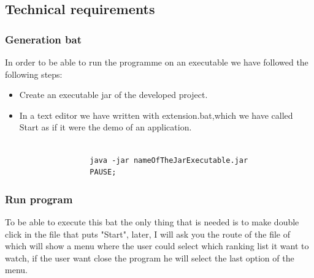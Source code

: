 \documentclass[a4paper]{article}
\theoremstyle{plain}
\theoremstyle{definition}
\begin{document}
    \subsection{Technical requirements}
        \subsubsection{Generation bat}
            In order to be able to run the programme on an executable we have followed the following steps:
        \begin{itemize}
            \item Create an executable jar of the developed project. 
            \item In a text editor we have written with extension.bat,which we have called Start as if it were the demo of an application.
                \begin{verbatim}

                java -jar nameOfTheJarExecutable.jar
                PAUSE;

                \end{verbatim}
        \end{itemize}
        \subsubsection{Run program}
	     To be able to execute this bat the only thing that is needed is to make double click in the file that puts "Start", later, I will ask you the route of the file of which will show a menu where the user could select which ranking list it want to watch, if the user want close the program he will select the last option of the menu.
	

	

	
	
\end{document}
